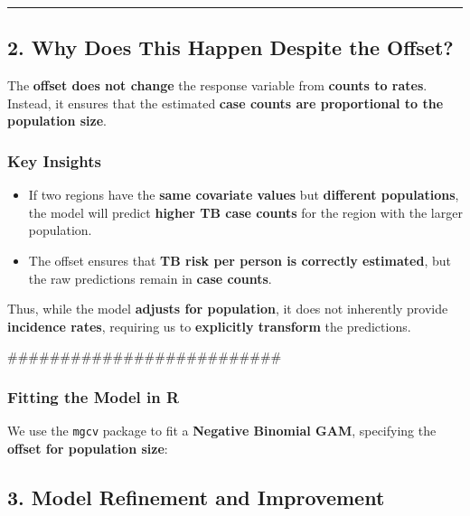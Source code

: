 \documentclass[
  11pt,
  a4paper,11pt]{article}
\providecommand{\tightlist}{%
  \setlength{\itemsep}{0pt}\setlength{\parskip}{0pt}}
\begin{document}
\begin{center}\rule{0.5\linewidth}{0.5pt}\end{center}

\subsection{\texorpdfstring{\textbf{2. Why Does This Happen Despite the
Offset?}}{2. Why Does This Happen Despite the Offset?}}\label{why-does-this-happen-despite-the-offset}

The \textbf{offset does not change} the response variable from
\textbf{counts to rates}. Instead, it ensures that the estimated
\textbf{case counts are proportional to the population size}.

\subsubsection{\texorpdfstring{\textbf{Key
Insights}}{Key Insights}}\label{key-insights}

\begin{itemize}
\tightlist
\item
  If two regions have the \textbf{same covariate values} but
  \textbf{different populations}, the model will predict \textbf{higher
  TB case counts} for the region with the larger population.
\item
  The offset ensures that \textbf{TB risk per person is correctly
  estimated}, but the raw predictions remain in \textbf{case counts}.
\end{itemize}

Thus, while the model \textbf{adjusts for population}, it does not
inherently provide \textbf{incidence rates}, requiring us to
\textbf{explicitly transform} the predictions.

\#\#\#\#\#\#\#\#\#\#\#\#\#\#\#\#\#\#\#\#\#\#\#\#\#\#

\subsubsection{\texorpdfstring{\textbf{Fitting the Model in
R}}{Fitting the Model in R}}\label{fitting-the-model-in-r}

We use the \texttt{mgcv} package to fit a \textbf{Negative Binomial
GAM}, specifying the \textbf{offset for population size}:

\subsection{\texorpdfstring{\textbf{3. Model Refinement and
Improvement}}{3. Model Refinement and Improvement}}\label{model-refinement-and-improvement}
\end{document}
